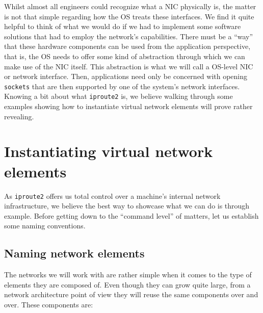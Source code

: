             Whilst almost all engineers could recognize what a NIC physically is, the matter is not that simple regarding how the OS treats these interfaces. We find it quite helpful to think of what we would do if we had to implement some software solutions that had to employ the network's capabilities. There must be a ``way'' that these hardware components can be used from the application perspective, that is, the OS needs to offer some kind of abstraction through which we can make use of the NIC itself. This abstraction is what we will call a OS-level NIC or network interface. Then, applications need only be concerned with opening \texttt{sockets} that are then supported by one of the system's network interfaces.\\

        Knowing a bit about what \texttt{iproute2} is, we believe walking through some examples showing how to instantiate virtual network elements will prove rather revealing.\\

    \section{Instantiating virtual network elements}
        As \texttt{iproute2} offers us total control over a machine's internal network infrastructure, we believe the best way to showcase what we can do is through example. Before getting down to the ``command level'' of matters, let us establish some naming conventions.\\

        \subsection{Naming network elements}
            The networks we will work with are rather simple when it comes to the type of elements they are composed of. Even though they can grow quite large, from a network architecture point of view they will reuse the same components over and over. These components are:\\

